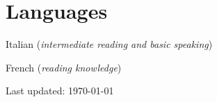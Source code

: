 \documentclass[10pt,letterpaper]{article}
\renewenvironment{itemize}{
  \begin{list}{}{
    \setlength{\leftmargin}{1.5em}
    \setlength{\itemsep}{0.25em}
    \setlength{\parskip}{0pt}
    \setlength{\parsep}{0.25em}
  }
}{
  \end{list}
}
\begin{document}
\section*{Languages}

\begin{itemize}
\item Italian (\emph{intermediate reading and basic speaking})\\
\item French (\emph{reading knowledge})
\end{itemize}
\vfill{} %


\begin{center}
{\scriptsize Last updated: \today\- } %
\end{center}

\end{document}
